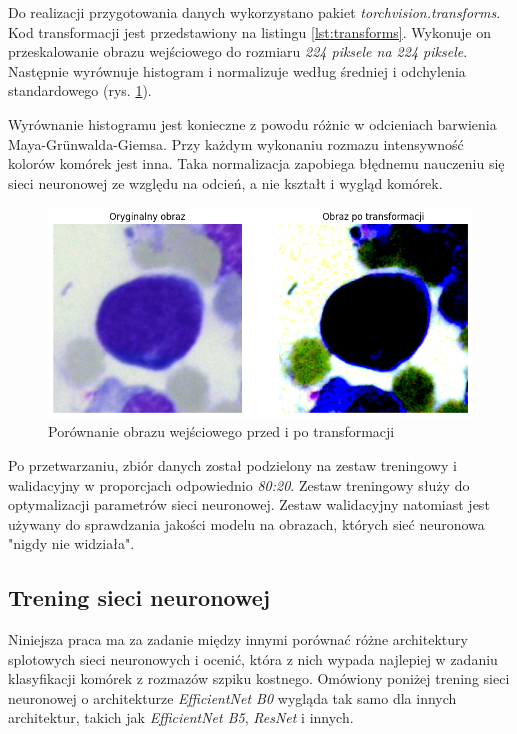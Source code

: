 Do realizacji przygotowania danych wykorzystano pakiet \textit{torchvision.transforms}.
Kod transformacji jest przedstawiony na listingu \ref{lst:transforms}.
Wykonuje on przeskalowanie obrazu wejściowego do rozmiaru \textit{224 piksele na 224 piksele}.
Następnie wyrównuje histogram i normalizuje według średniej i odchylenia standardowego (rys. \ref{fig:transformations_example}).

Wyrównanie histogramu jest konieczne z powodu różnic w odcieniach barwienia Maya-Grünwalda-Giemsa.
Przy każdym wykonaniu rozmazu intensywność kolorów komórek jest inna.
Taka normalizacja zapobiega błędnemu nauczeniu się sieci neuronowej ze względu na odcień, a nie kształt i wygląd komórek.

\begin{figure}
    \centering
    \includegraphics[width=\textwidth]{image_transform}
    \caption{Porównanie obrazu wejściowego przed i po transformacji}
    \label{fig:transformations_example}
\end{figure}

Po przetwarzaniu, zbiór danych został podzielony na zestaw treningowy i walidacyjny w proporcjach odpowiednio \textit{80:20}.
Zestaw treningowy służy do optymalizacji parametrów sieci neuronowej.
Zestaw walidacyjny natomiast jest używany do sprawdzania jakości modelu na obrazach, których sieć neuronowa "nigdy nie widziała".

\subsection{Trening sieci neuronowej}

Niniejsza praca ma za zadanie między innymi porównać różne architektury splotowych sieci neuronowych i ocenić,
która z nich wypada najlepiej w zadaniu klasyfikacji komórek z rozmazów szpiku kostnego.
Omówiony poniżej trening sieci neuronowej o architekturze \textit{EfficientNet B0} wygląda tak samo dla innych architektur, takich jak \textit{EfficientNet B5}, \textit{ResNet} i innych.

